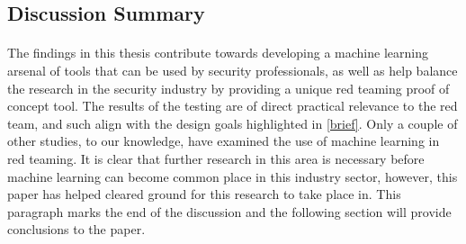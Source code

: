 \subsection{Discussion Summary}
\paragraph{}The findings in this thesis contribute towards developing a machine learning arsenal of tools that can be used by security professionals, as well as help balance the research in the security industry by providing a unique red teaming proof of concept tool. The results of the testing are of direct practical relevance to the red team, and such align with the design goals highlighted in \ref{brief}. Only a couple of other studies, to our knowledge, have examined the use of machine learning in red teaming. It is clear that further research in this area is necessary before machine learning can become common place in this industry sector, however, this paper has helped cleared ground for this research to take place in. This paragraph marks the end of the discussion and the following section will provide conclusions to the paper.
